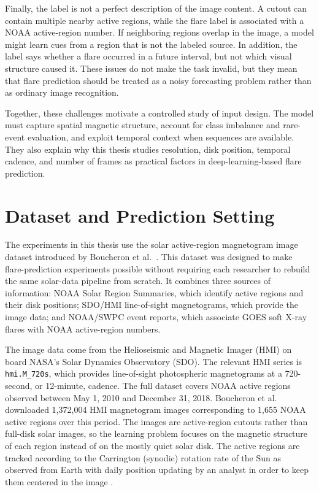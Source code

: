 Finally, the label is not a perfect description of the image content. A cutout can contain multiple nearby active regions, while the flare label is associated with a NOAA active-region number. If neighboring regions overlap in the image, a model might learn cues from a region that is not the labeled source. In addition, the label says whether a flare occurred in a future interval, but not which visual structure caused it. These issues do not make the task invalid, but they mean that flare prediction should be treated as a noisy forecasting problem rather than as ordinary image recognition.

Together, these challenges motivate a controlled study of input design. The model must capture spatial magnetic structure, account for class imbalance and rare-event evaluation, and exploit temporal context when sequences are available. They also explain why this thesis studies resolution, disk position, temporal cadence, and number of frames as practical factors in deep-learning-based flare prediction.

\section{Dataset and Prediction Setting}

The experiments in this thesis use the solar active-region magnetogram image dataset introduced by Boucheron et al.~\cite{ref_boucheron}. This dataset was designed to make flare-prediction experiments possible without requiring each researcher to rebuild the same solar-data pipeline from scratch. It combines three sources of information: NOAA Solar Region Summaries, which identify active regions and their disk positions; SDO/HMI line-of-sight magnetograms, which provide the image data; and NOAA/SWPC event reports, which associate GOES soft X-ray flares with NOAA active-region numbers.

The image data come from the Helioseismic and Magnetic Imager (HMI) on board NASA's Solar Dynamics Observatory (SDO). The relevant HMI series is \texttt{hmi.M\_720s}, which provides line-of-sight photospheric magnetograms at a 720-second, or 12-minute, cadence. The full dataset covers NOAA active regions observed between May 1, 2010 and December 31, 2018. Boucheron et al. downloaded 1,372,004 HMI magnetogram images corresponding to 1,655 NOAA active regions over this period. The images are active-region cutouts rather than full-disk solar images, so the learning problem focuses on the magnetic structure of each region instead of on the mostly quiet solar disk. The active regions are tracked according to the Carrington (synodic) rotation rate of the Sun as observed from Earth with daily position updating by an analyst in order to keep them centered in the image \cite{ref_boucheron}.

